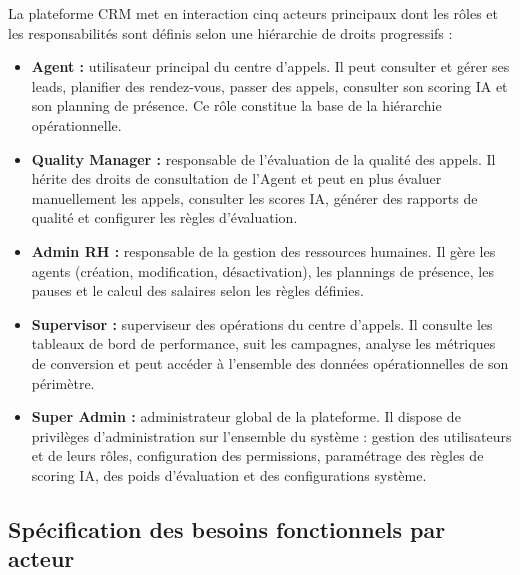 La plateforme CRM met en interaction cinq acteurs principaux dont les rôles et les
responsabilités sont définis selon une hiérarchie de droits progressifs :

\begin{itemize}[label=\textbullet, itemsep=5pt]

    \item \textbf{Agent :}
    utilisateur principal du centre d'appels. Il peut consulter et gérer ses leads, planifier
    des rendez-vous, passer des appels, consulter son scoring IA et son planning de présence.
    Ce rôle constitue la base de la hiérarchie opérationnelle.

    \item \textbf{Quality Manager :}
    responsable de l'évaluation de la qualité des appels. Il hérite des droits de consultation
    de l'Agent et peut en plus évaluer manuellement les appels, consulter les scores IA,
    générer des rapports de qualité et configurer les règles d'évaluation.

    \item \textbf{Admin RH :}
    responsable de la gestion des ressources humaines. Il gère les agents (création,
    modification, désactivation), les plannings de présence, les pauses et le calcul des
    salaires selon les règles définies.

    \item \textbf{Supervisor :}
    superviseur des opérations du centre d'appels. Il consulte les tableaux de bord de
    performance, suit les campagnes, analyse les métriques de conversion et peut accéder
    à l'ensemble des données opérationnelles de son périmètre.

    \item \textbf{Super Admin :}
    administrateur global de la plateforme. Il dispose de privilèges d'administration sur
    l'ensemble du système : gestion des utilisateurs et de leurs rôles, configuration des
    permissions, paramétrage des règles de scoring IA, des poids d'évaluation et des
    configurations système.

\end{itemize}

\subsection{Spécification des besoins fonctionnels par acteur}

